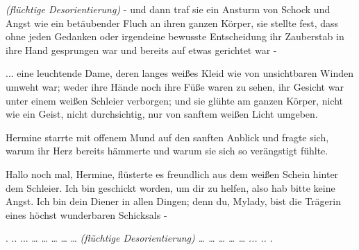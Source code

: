 \emph{(flüchtige Desorientierung)}
\emph{} - und dann traf sie ein Ansturm von Schock und Angst wie ein
betäubender Fluch an ihren ganzen Körper, sie stellte fest, dass ohne jeden
Gedanken oder irgendeine bewusste Entscheidung ihr Zauberstab in ihre Hand
gesprungen war und bereits auf etwas gerichtet war -

... eine leuchtende Dame, deren langes weißes Kleid wie von unsichtbaren Winden
umweht war; weder ihre Hände noch ihre Füße waren zu sehen, ihr Gesicht war
unter einem weißen Schleier verborgen; und sie glühte am ganzen Körper, nicht
wie ein Geist, nicht durchsichtig, nur von sanftem weißen Licht umgeben.

Hermine starrte mit offenem Mund auf den sanften Anblick und fragte sich, warum
ihr Herz bereits hämmerte und warum sie sich so verängstigt fühlte.

\glqq{}Hallo noch mal, Hermine\grqq{}, flüsterte es freundlich aus dem weißen
Schein hinter dem Schleier. \glqq{}Ich bin geschickt worden, um dir zu helfen,
also hab bitte keine Angst. Ich bin dein Diener in allen Dingen; denn du,
Mylady, bist die Trägerin eines höchst wunderbaren Schicksals -\grqq{}

. .. ... … … … … …
\emph{(flüchtige Desorientierung)}
\emph{… … …}
\emph{… …}
\emph{...}
\emph{..}
\emph{.}

